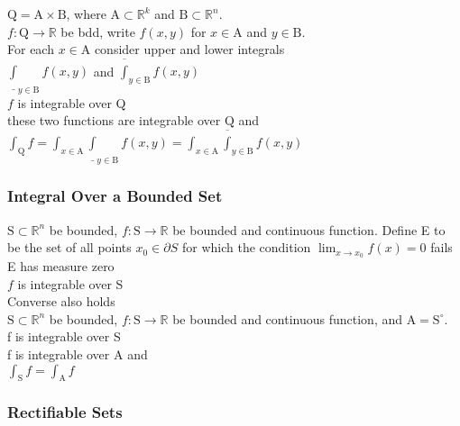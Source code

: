 \LET $\mathrm{Q}=\mathrm{A}\times\mathrm{B}$,
where $\mathrm{A}\subset\mathbb{R}^k$ and
$\mathrm{B}\subset\mathbb{R}^n$.\\
$f:\mathrm{Q}\to\mathbb{R}$ be bdd,
write $f(x,y)$ for $x\in\mathrm{A}$ and 
$y\in\mathrm{B}$.\\
For each $x\in\mathrm{A}$ consider upper and lower integrals\\
$\underline{\int}_{y\in\mathrm{B}}f(x,y)$ and
$\overline{\int}_{y\in\mathrm{B}}f(x,y)$\\
\IF $f$ is integrable over Q\\
\THEN these two functions are integrable over $\mathrm{Q}$ and
$\int_{\mathrm{Q}}f = \int_{x\in\mathrm{A}}\underline{\int}_{y\in\mathrm{B}}f(x,y) =
\int_{x\in\mathrm{A}}\overline{\int}_{y\in\mathrm{B}}f(x,y)$


\vfill
\subsubsection{Integral Over a Bounded Set}
\LET $\mathrm{S}\subset\mathbb{R}^n$ be bounded, 
$f:\mathrm{S}\to\mathbb{R}$ be bounded and continuous function.
Define E to be the set of all points $x_0\in\partial S$ for which the condition
$\lim_{x\to x_0} f(x) = 0$ fails\\
\IF E has measure zero\\
\THEN $f$ is integrable over S\\
Converse also holds\\

\LET $\mathrm{S}\subset\mathbb{R}^n$ be bounded, 
$f:\mathrm{S}\to\mathbb{R}$ be bounded and continuous function, 
and $\mathrm{A}=\mathrm{S}^{\circ}$.\\
\IF f is integrable over S\\
\THEN f is integrable over A and\\ 
$\int_{\mathrm{S}} f = \int_{\mathrm{A}}f$

\subsubsection{Rectifiable Sets}